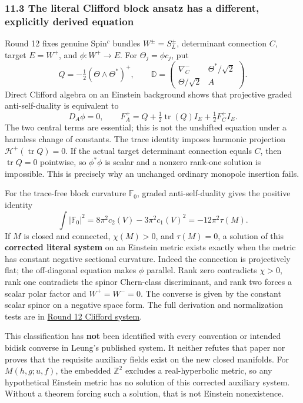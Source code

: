 \documentclass[
  english,
]{article}
\begin{document}
\hypertarget{the-literal-clifford-block-ansatz-has-a-different-explicitly-derived-equation}{%
\subsubsection{11.3 The literal Clifford block ansatz has a different,
explicitly derived
equation}\label{the-literal-clifford-block-ansatz-has-a-different-explicitly-derived-equation}}

Round 12 fixes genuine Spin\(^{c}\) bundles \(W^\pm=S_L^\pm\),
determinant connection \(C\), target \(E=W^+\), and \(\phi:W^+\to E\).
For \(\Theta_j=\phi c_j\), put \[
 Q=-\tfrac12(\Theta\wedge\Theta^*)^+,\qquad
 \mathbb D=\begin{pmatrix}\nabla_C^-&\Theta^*/\sqrt2\\
                          \Theta/\sqrt2&A\end{pmatrix}.
\] Direct Clifford algebra on an Einstein background shows that
projective graded anti-self-duality is equivalent to \[
 D_A\phi=0,\qquad
 F_A^+=Q+\tfrac12\operatorname{tr}(Q)I_E+\tfrac12F_C^+I_E.
\] The two central terms are essential; this is not the unshifted
equation under a harmless change of constants. The trace identity
imposes harmonic projection \(\mathcal H^+(\operatorname{tr}Q)=0\). If
the actual target determinant connection equals \(C\), then
\(\operatorname{tr}Q=0\) pointwise, so \(\phi^*\phi\) is scalar and a
nonzero rank-one solution is impossible. This is precisely why an
unchanged ordinary monopole insertion fails.

For the trace-free block curvature \(\mathbb F_0\), graded
anti-self-duality gives the positive identity \[
 \int|\mathbb F_0|^2
 =8\pi^2c_2(V)-3\pi^2c_1(V)^2=-12\pi^2\tau(M).
\] If \(M\) is closed and connected, \(\chi(M)>0\), and \(\tau(M)=0\), a
solution of this \textbf{corrected literal system} on an Einstein metric
exists exactly when the metric has constant negative sectional
curvature. Indeed the connection is projectively flat; the off-diagonal
equation makes \(\phi\) parallel. Rank zero contradicts \(\chi>0\), rank
one contradicts the spinor Chern-class discriminant, and rank two forces
a scalar polar factor and \(W^+=W^-=0\). The converse is given by the
constant scalar spinor on a negative space form. The full derivation and
normalization tests are in
\href{../proofs/round12_uniformization.md}{Round 12 Clifford system}.

This classification has \textbf{not} been identified with every
convention or intended bidisk converse in Leung's published system. It
neither refutes that paper nor proves that the requisite auxiliary
fields exist on the new closed manifolds. For \(M(h,g;u,f)\), the
embedded \(\mathbb Z^2\) excludes a real-hyperbolic metric, so any
hypothetical Einstein metric has no solution of this corrected auxiliary
system. Without a theorem forcing such a solution, that is not Einstein
nonexistence.
\end{document}
